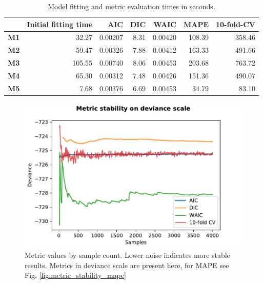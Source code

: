 \documentclass[english, 12pt, a4paper, sci, utf8, a-1b, online]{aaltothesis}
\begin{document}
\begin{table}[htb]
	\centering
	\caption{Model fitting and metric evaluation times in seconds.}
	\label{tab:times}
	\begin{tabular}{|r|r|r|r|r|r|r|}
	\hline
	\textbf{}   & \textbf{Initial fitting time} & \textbf{AIC} & \textbf{DIC} & \textbf{WAIC} & \textbf{MAPE} & \textbf{10-fold-CV} \\ \hline
	\textbf{M1} & 32.27                         & 0.00207      & 8.31         & 0.00420       & 108.39        & 358.46              \\ \hline
	\textbf{M2} & 59.47                         & 0.00326      & 7.88         & 0.00412       & 163.33        & 491.66              \\ \hline
	\textbf{M3} & 105.55                        & 0.00740      & 8.06         & 0.00453       & 203.68        & 763.72              \\ \hline
	\textbf{M4} & 65.30                         & 0.00312      & 7.48         & 0.00426       & 151.36        & 490.07              \\ \hline
	\textbf{M5} & 7.68                          & 0.00376      & 6.69         & 0.00453       & 34.79         & 83.10               \\ \hline
	\end{tabular}
\end{table}

\begin{figure}[hbt]
	\centering
	\includegraphics{../plots/stability/metric_stability.pdf}
	\caption{\label{fig:metric_stability_deviance}Metric values by sample count. Lower noise indicates more stable results. Metrics in deviance scale are present here, for MAPE see Fig. \ref{fig:metric_stability_mape}}
\end{figure}
\end{document}
